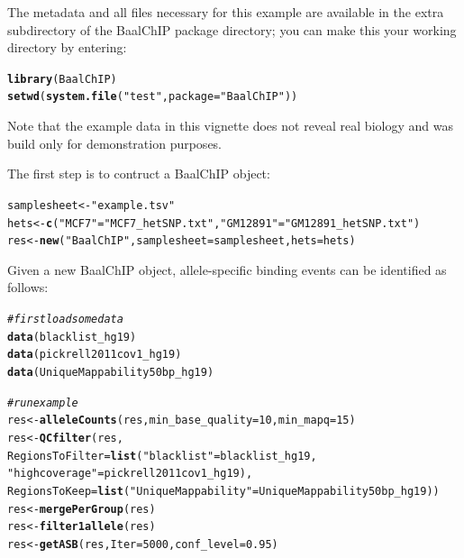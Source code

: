 \documentclass{article}\usepackage[]{graphicx}\usepackage[usenames,dvipsnames]{color}
\makeatletter
\newcommand{\hlnum}[1]{\textcolor[rgb]{0.686,0.059,0.569}{#1}}%
\newcommand{\hlstr}[1]{\textcolor[rgb]{0.192,0.494,0.8}{#1}}%
\newcommand{\hlcom}[1]{\textcolor[rgb]{0.678,0.584,0.686}{\textit{#1}}}%
\newcommand{\hlstd}[1]{\textcolor[rgb]{0.345,0.345,0.345}{#1}}%
\newcommand{\hlkwb}[1]{\textcolor[rgb]{0.69,0.353,0.396}{#1}}%
\newcommand{\hlkwc}[1]{\textcolor[rgb]{0.333,0.667,0.333}{#1}}%
\newcommand{\hlkwd}[1]{\textcolor[rgb]{0.737,0.353,0.396}{\textbf{#1}}}%
\newenvironment{kframe}{%
 \def\at@end@of@kframe{}%
 \ifinner\ifhmode%
  \def\at@end@of@kframe{\end{minipage}}%
  \begin{minipage}{\columnwidth}%
 \fi\fi%
 \def\FrameCommand##1{\hskip\@totalleftmargin \hskip-\fboxsep
 \colorbox{shadecolor}{##1}\hskip-\fboxsep
     \hskip-\linewidth \hskip-\@totalleftmargin \hskip\columnwidth}%
 \MakeFramed {\advance\hsize-\width
   \@totalleftmargin\z@ \linewidth\hsize
   \@setminipage}}%
 {\par\unskip\endMakeFramed%
 \at@end@of@kframe}
\newenvironment{knitrout}{}{} %
\makeatother
\begin{document}
The metadata and all files necessary for this example are available in the extra subdirectory
of the BaalChIP package directory; you can make this your working directory by entering:

\begin{knitrout}
\color{fgcolor}\begin{kframe}
\begin{alltt}
\hlkwd{library}\hlstd{(BaalChIP)}
\hlkwd{setwd}\hlstd{(}\hlkwd{system.file}\hlstd{(}\hlstr{"test"}\hlstd{,}\hlkwc{package}\hlstd{=}\hlstr{"BaalChIP"}\hlstd{))}
\end{alltt}
\end{kframe}
\end{knitrout}
Note that the example data in this vignette does not reveal real biology and was build only for demonstration purposes.

The first step is to contruct a BaalChIP object:
\begin{knitrout}
\color{fgcolor}\begin{kframe}
\begin{alltt}
\hlstd{samplesheet} \hlkwb{<-} \hlstr{"example.tsv"}
\hlstd{hets} \hlkwb{<-} \hlkwd{c}\hlstd{(}\hlstr{"MCF7"}\hlstd{=}\hlstr{"MCF7_hetSNP.txt"}\hlstd{,} \hlstr{"GM12891"}\hlstd{=}\hlstr{"GM12891_hetSNP.txt"}\hlstd{)}
\hlstd{res} \hlkwb{<-} \hlkwd{new}\hlstd{(}\hlstr{"BaalChIP"}\hlstd{,} \hlkwc{samplesheet}\hlstd{=samplesheet,} \hlkwc{hets}\hlstd{=hets)}
\end{alltt}
\end{kframe}
\end{knitrout}

Given a new BaalChIP object, allele-specific binding events can be identified as follows:
\begin{knitrout}
\color{fgcolor}\begin{kframe}
\begin{alltt}
\hlcom{#first load some data}
\hlkwd{data}\hlstd{(blacklist_hg19)}
\hlkwd{data}\hlstd{(pickrell2011cov1_hg19)}
\hlkwd{data}\hlstd{(UniqueMappability50bp_hg19)}

\hlcom{#run example}
\hlstd{res} \hlkwb{<-} \hlkwd{alleleCounts}\hlstd{(res,} \hlkwc{min_base_quality}\hlstd{=}\hlnum{10}\hlstd{,} \hlkwc{min_mapq}\hlstd{=}\hlnum{15}\hlstd{)}
\hlstd{res} \hlkwb{<-} \hlkwd{QCfilter}\hlstd{(res,}
                \hlkwc{RegionsToFilter}\hlstd{=}\hlkwd{list}\hlstd{(}\hlstr{"blacklist"}\hlstd{=blacklist_hg19,}
                                     \hlstr{"highcoverage"}\hlstd{=pickrell2011cov1_hg19),}
                \hlkwc{RegionsToKeep}\hlstd{=}\hlkwd{list}\hlstd{(}\hlstr{"UniqueMappability"}\hlstd{=UniqueMappability50bp_hg19))}
\hlstd{res} \hlkwb{<-} \hlkwd{mergePerGroup}\hlstd{(res)}
\hlstd{res} \hlkwb{<-} \hlkwd{filter1allele}\hlstd{(res)}
\hlstd{res} \hlkwb{<-} \hlkwd{getASB}\hlstd{(res,} \hlkwc{Iter}\hlstd{=}\hlnum{5000}\hlstd{,} \hlkwc{conf_level}\hlstd{=}\hlnum{0.95}\hlstd{)}
\end{alltt}
\end{kframe}
\end{knitrout}
\end{document}
